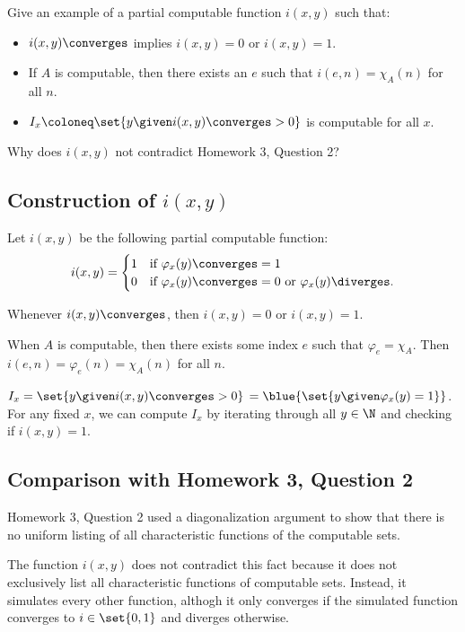 \begin{problem}
  Give an example of a partial computable function $i(x, y)$ such that:
  \begin{itemize}
    \item $i(x, y) \converges$ implies $i(x, y) = 0$ or $i(x, y) = 1$.
    \item If $A$ is computable, then there exists an $e$ such that
      $i(e, n) = \chi_A(n)$ for all $n$.
    \item $I_x \coloneq \set{ y \given i(x, y) \converges > 0 }$ is computable
      for all $x$.
  \end{itemize}
  Why does $i(x, y)$ not contradict Homework 3, Question 2?

  \begin{answer}
    \subsection*{Construction of $i(x, y)$}
    Let $i(x, y)$ be the following partial computable function:
    \[
      i(x, y) = \begin{cases}
        1 & \text{if } \varphi_x(y) \converges= 1 \\
        0 & \text{if } \varphi_x(y) \converges= 0
            \text{ or } \varphi_x(y) \diverges.
      \end{cases}
    \]

    \begin{enumarabic}
      \item Whenever $i(x, y) \converges$, then $i(x, y) = 0$ or $i(x, y) = 1$.
      \item When $A$ is computable, then there exists some index $e$
        such that $\varphi_e = \chi_A$.
        Then $i(e, n) = \varphi_e(n) = \chi_A(n)$ for all $n$.
      \item $I_x = \set{ y \given i(x, y) \converges > 0 }$
        $=\blue{\set{y \given \varphi_x(y) = 1}}$.
        For any fixed $x$, we can compute $I_x$ by iterating
        through all $y \in \N$ and checking if
        $i(x, y) = 1$.
    \end{enumarabic}

    \subsection*{Comparison with Homework 3, Question 2}

    Homework 3, Question 2 used a diagonalization argument
    to show that there is no uniform listing of all 
    characteristic functions of the computable sets.

    The function $i(x, y)$ does not contradict this fact because
    it does not exclusively list all characteristic functions
    of computable sets.
    Instead, it simulates every other function, althogh it only
    converges if the simulated function converges to $i \in \set{0, 1}$
    and diverges otherwise.
  \end{answer}
\end{problem}

